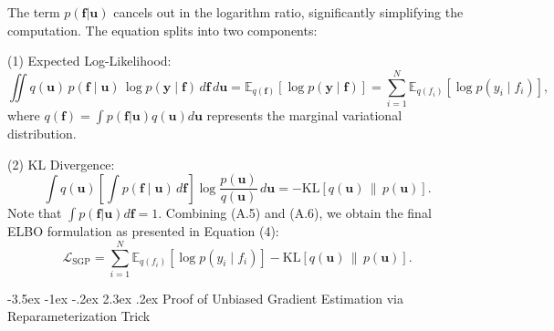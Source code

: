 \documentclass[11pt]{article}
\makeatletter
\renewcommand\section{\@startsection {section}{1}{\z@}%
	{-3.5ex \@plus -1ex \@minus -.2ex}%
	{2.3ex \@plus.2ex}%
	{\normalfont\fontfamily{phv}\fontsize{16}{19}\bfseries}}
\makeatother
\begin{document}
	The term $p(\mathbf{f} | \mathbf{u})$ cancels out in the logarithm ratio, significantly simplifying the computation. The equation splits into two components:

	(1) Expected Log-Likelihood:
	\begin{equation}
		\iint q(\mathbf{u})\,p(\mathbf{f}\mid \mathbf{u})\,\log p(\mathbf{y}\mid \mathbf{f})\,d\mathbf{f}\,d\mathbf{u}
		= \mathbb{E}_{q(\mathbf{f})}\!\left[\log p(\mathbf{y}\mid \mathbf{f})\right]
		= \sum_{i=1}^{N}\mathbb{E}_{q(f_i)}\!\left[\log p(y_i\mid f_i)\right],
	\end{equation}
	where $q(\mathbf{f}) = \int p(\mathbf{f} | \mathbf{u}) q(\mathbf{u}) d\mathbf{u}$ represents the marginal variational distribution.

	(2) KL Divergence:
	\begin{equation}
		\int q(\mathbf{u})\left[\int p(\mathbf{f}\mid \mathbf{u})\,d\mathbf{f}\right]
		\log\frac{p(\mathbf{u})}{q(\mathbf{u})}\,d\mathbf{u}
		= -\mathrm{KL}\!\left[q(\mathbf{u})\,\|\,p(\mathbf{u})\right].
	\end{equation}
	Note that $\int p(\mathbf{f} | \mathbf{u}) d\mathbf{f} = 1$.
	Combining (A.5) and (A.6), we obtain the final ELBO formulation as presented in Equation (4):
	\begin{equation}
		\mathcal{L}_{\mathrm{SGP}}
		= \sum_{i=1}^{N}\mathbb{E}_{q(f_i)}\!\left[\log p(y_i\mid f_i)\right]
		- \mathrm{KL}\!\left[q(\mathbf{u})\,\|\,p(\mathbf{u})\right].
	\end{equation}










	\section{Proof of Unbiased Gradient Estimation via Reparameterization Trick} \label{app:B}
	\resetappendixcounters %
\end{document}
